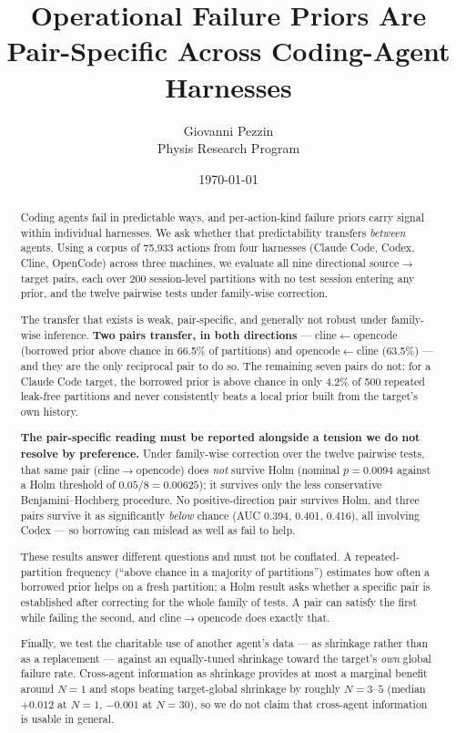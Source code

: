 \documentclass[11pt]{article}
\title{Operational Failure Priors Are Pair-Specific Across Coding-Agent
Harnesses}
\author{Giovanni Pezzin \\ Physis Research Program}
\date{\today}
\begin{document}
\maketitle

\begin{abstract}
Coding agents fail in predictable ways, and per-action-kind failure priors
carry signal within individual harnesses. We ask whether that predictability
transfers \emph{between} agents. Using a corpus of 75,933 actions from four
harnesses (Claude Code, Codex, Cline, OpenCode) across three machines, we
evaluate all nine directional source$\to$target pairs, each over 200
session-level partitions with no test session entering any prior, and the
twelve pairwise tests under family-wise correction.

The transfer that exists is weak, pair-specific, and generally not robust
under family-wise inference. \textbf{Two pairs transfer, in both directions} ---
cline$\leftarrow$opencode (borrowed prior above chance in 66.5\% of
partitions) and opencode$\leftarrow$cline (63.5\%) --- and they are the only
reciprocal pair to do so. The remaining seven pairs do not: for a Claude Code
target, the borrowed prior is above chance in only 4.2\% of 500 repeated
leak-free partitions and never consistently beats a local prior built from the
target's own history.

\noindent\textbf{The pair-specific reading must be reported alongside a tension
we do not resolve by preference.} Under family-wise correction over the twelve
pairwise tests, that same pair (cline$\to$opencode) does \emph{not} survive
Holm (nominal $p = 0.0094$ against a Holm threshold of $0.05/8 = 0.00625$); it
survives only the less conservative Benjamini--Hochberg procedure. No
positive-direction pair survives Holm, and three pairs survive it as
significantly \emph{below} chance (AUC 0.394, 0.401, 0.416), all involving
Codex --- so borrowing can mislead as well as fail to help.

These results answer different questions and must not be conflated. A
repeated-partition frequency (``above chance in a majority of partitions'')
estimates how often a borrowed prior helps on a fresh partition; a Holm result
asks whether a specific pair is established after correcting for the whole
family of tests. A pair can satisfy the first while failing the second, and
cline$\to$opencode does exactly that.

Finally, we test the charitable use of another agent's data --- as shrinkage
rather than as a replacement --- against an equally-tuned shrinkage toward the
target's \emph{own} global failure rate. Cross-agent information as shrinkage
provides at most a marginal benefit around $N=1$ and stops beating target-global
shrinkage by roughly $N=3$--$5$ (median $+0.012$ at $N=1$, $-0.001$ at $N=30$),
so we do not claim that cross-agent information is usable in general.

\end{abstract}
\end{document}
